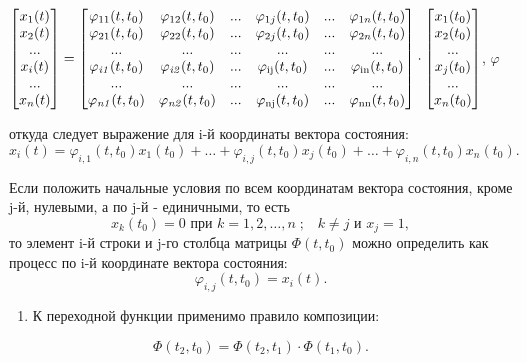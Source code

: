 		
		$\left[\begin{matrix}x_1(t)\\x_2(t)\\...\\x_i(t)\\...\\x_n(t)\end{matrix}\right]=\left[\begin{matrix}\varphi _{11}(t,t_0)&\varphi _{12}(t,t_0)&...&\varphi _{1j}(t,t_0)&...&\varphi _{1n}(t,t_0)\\\varphi _{21}(t,t_0)&\varphi _{22}(t,t_0)&...&\varphi _{2j}(t,t_0)&...&\varphi _{2n}(t,t_0)\\...&...&...&...&...&...\\\varphi _{\mathit{i1}}(t,t_0)&\varphi _{\mathit{i2}}(t,t_0)&...&\varphi _{\normalsubformula{\text{ij}}}(t,t_0)&...&\varphi _{\normalsubformula{\text{in}}}(t,t_0)\\...&...&...&...&...&...\\\varphi _{\mathit{n1}}(t,t_0)&\varphi _{\mathit{n2}}(t,t_0)&...&\varphi _{\text{nj}}(t,t_0)&...&\varphi _{\normalsubformula{\text{nn}}}(t,t_0)\end{matrix}\right]\cdot
		\left[\begin{matrix}x_1(t_0)\\x_2(t_0)\\...\\x_j(t_0)\\...\\x_n(t_0)\end{matrix}\right]$,
$ \varphi $


		откуда следует выражение для i-й координаты вектора состояния:
\begin{equation*}
x_i(t)=\varphi _{i,1}(t,t_0)x_1(t_0)+\ldots +\varphi _{i,j}(t,t_0)x_j(t_0)+\ldots +\varphi _{i,n}(t,t_0)x_n(t_0).
\end{equation*}


		Если положить начальные условия по всем координатам вектора состояния, кроме {\textrm{j}}-й, нулевыми, а по
		{\textrm{j}}-й - единичными, то есть
\begin{equation}\label{eq"2_3_6}
		x_k(t_0)=0 \text{ при }  k=1,2,\ldots,n\;;\;\;\;k\neq j  \text{ и }   x_j=1, %
\end{equation}
		то элемент {i}-й строки и {j}-го столбца матрицы  $\Phi (t,t_0)$ можно определить как процесс по i-й
		координате вектора состояния:
		\begin{equation}\label{eq:2_3_7}
		\varphi _{i,j}(t,t_0)=x_i(t).  
		\end{equation}
\liststyleWWviiiNumlxviii
\begin{enumerate}
	\item 
			К переходной функции применимо правило композиции:
	
\end{enumerate}
		\begin{equation}\label{eq:2_3_8}
		\Phi (t_2,t_0)=\Phi (t_2,t_1)\cdot \Phi (t_1,t_0). 
		\end{equation}



